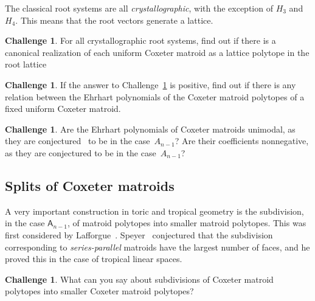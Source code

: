 \documentclass[11pt]{amsart}
\theoremstyle{definition}
\newtheorem{challenge}[theorem]{Challenge}
\begin{document}
The classical root systems are all \emph{crystallographic}, with the exception of $H_3$ and $H_4$.
This means that the root vectors generate a lattice.

\begin{challenge}\label{chall:root-lattice}
  For all crystallographic root systems, find out if there is a canonical realization of each uniform Coxeter matroid as a lattice polytope in the root lattice
\end{challenge}

\begin{challenge}
  If the answer to Challenge~\ref{chall:root-lattice} is positive, find out if there is any relation between the Ehrhart polynomials of the Coxeter matroid polytopes of a fixed uniform Coxeter matroid.
\end{challenge}

\begin{challenge}
  Are the Ehrhart polynomials of Coxeter matroids unimodal, as they are conjectured~\cite{loera09} to be in the case~$A_{n-1}$? 
  Are their coefficients nonnegative, as they are conjectured to be in the case~$A_{n-1}$? 
\end{challenge}

\subsection{Splits of Coxeter matroids}

A very important construction in toric and tropical geometry is the
subdivision, in the case $\mathsf{A}_{n-1}$, of matroid polytopes into
smaller matroid polytopes. This was first considered by
Lafforgue~\cite{l-2003}. Speyer~\cite{speyer-2008} conjectured that
the subdivision corresponding to \emph{series-parallel} matroids have
the largest number of faces, and he proved this in the case of
tropical linear spaces.

\begin{challenge}
  What can you say about subdivisions of Coxeter
  matroid polytopes into smaller Coxeter matroid polytopes?
\end{challenge}



\end{document}
